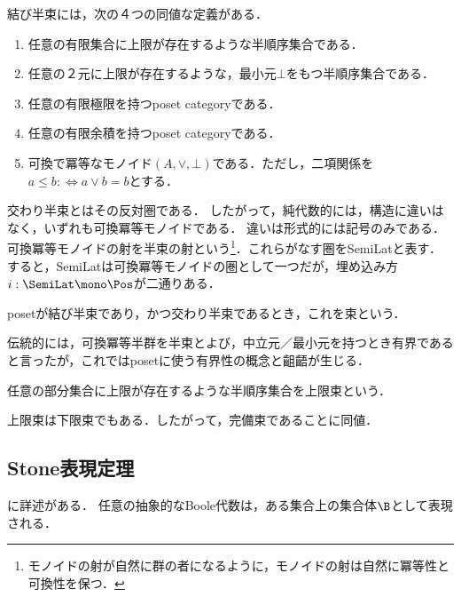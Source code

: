\documentclass[uplatex, dvipdfmx]{jsreport}
\begin{document}
\begin{definition}
    結び半束には，次の４つの同値な定義がある．
    \begin{enumerate}
        \item 任意の有限集合に上限が存在するような半順序集合である．
        \item 任意の２元に上限が存在するような，最小元$\bot$をもつ半順序集合である．
        \item 任意の有限極限を持つposet categoryである．
        \item 任意の有限余積を持つposet categoryである．
        \item 可換で冪等なモノイド$(A,\lor,\bot)$である．ただし，二項関係を$a\le b:\Leftrightarrow a\lor b=b$とする．
    \end{enumerate}
    交わり半束とはその反対圏である．
    したがって，純代数的には，構造に違いはなく，いずれも可換冪等モノイドである．
    違いは形式的には記号のみである．可換冪等モノイドの射を半束の射という\footnote{モノイドの射が自然に群の者になるように，モノイドの射は自然に冪等性と可換性を保つ．}．これらがなす圏をSemiLatと表す．
    すると，SemiLatは可換冪等モノイドの圏として一つだが，埋め込み方$i:\SemiLat\mono\Pos$が二通りある．

    posetが結び半束であり，かつ交わり半束であるとき，これを束という．
\end{definition}
\begin{remark}
    伝統的には，可換冪等半群を半束とよび，中立元／最小元を持つとき有界であると言ったが，これではposetに使う有界性の概念と齟齬が生じる．
\end{remark}

\begin{definition}[suplattice]
    任意の部分集合に上限が存在するような半順序集合を上限束という．
\end{definition}

\begin{lemma}
    上限束は下限束でもある．したがって，完備束であることに同値．
\end{lemma}

\subsection{Stone表現定理}

\begin{tcolorbox}[colframe=ForestGreen, colback=ForestGreen!10!white,breakable,colbacktitle=ForestGreen!40!white,coltitle=black,fonttitle=\bfseries\sffamily,
title=]
    \cite{Tao10-AnEpsilonOfRoom}に詳述がある．
    任意の抽象的なBoole代数は，ある集合上の集合体$\B$として表現される．
\end{tcolorbox}
\end{document}
